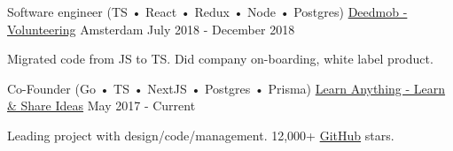 \begin{cventries}
  \cventry
    {Software engineer (TS • React • Redux • Node • Postgres)}
    {\href{https://www.deedmob.com}{Deedmob - Volunteering}}
    {Amsterdam}
    {July 2018 - December 2018}
     {
      \begin{cvitems}
        \item {Migrated code from JS to TS. Did company on-boarding, white label product.}
      \end{cvitems}
    }

  \cventry
    {Co-Founder (Go • TS • NextJS • Postgres • Prisma)}
    {\href{https://learn-anything.xyz}{Learn Anything - Learn \& Share Ideas}}
    {}
    {May 2017 - Current}
     {
      \begin{cvitems}
        \item {Leading project with design/code/management. 12,000+ \href{https://github.com/learn-anything/learn-anything}{GitHub} stars.}
      \end{cvitems}
    }

\end{cventries}

